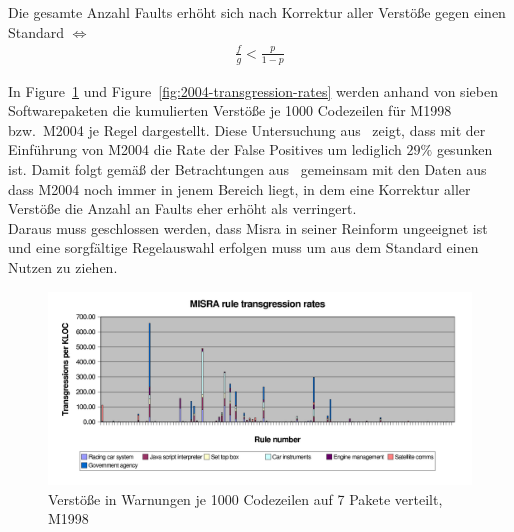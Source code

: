 \documentclass[a4paper,UKenglish,cleveref, autoref]{templates/lipics-v2019}
\begin{document}
    \begin{theorem}
        Die gesamte Anzahl Faults erhöht sich nach Korrektur aller Verstöße gegen einen Standard $\iff$
        \begin{gather*}
            \frac{f}{g} < \frac{p}{1-p}
        \end{gather*}
    \end{theorem}


    In Figure~\ref{fig:1998-transgression-rates} und Figure~\ref{fig:2004-transgression-rates} werden anhand von sieben
    Softwarepaketen die kumulierten Verstöße je 1000 Codezeilen für M1998 bzw.\ M2004 je Regel dargestellt.
    Diese Untersuchung aus~\cite{hatton2007language} zeigt, dass mit der Einführung von M2004 die Rate der False Positives
    um lediglich $29\%$ gesunken ist.
    Damit folgt gemäß der Betrachtungen aus~\cite{hatton2007language} gemeinsam mit den Daten aus~\cite{transgression-data}
    dass M2004 noch immer in jenem Bereich liegt, in dem eine Korrektur aller Verstöße die Anzahl an Faults
    eher erhöht als verringert.\\
    Daraus muss geschlossen werden, dass Misra in seiner Reinform ungeeignet ist und eine sorgfältige Regelauswahl erfolgen
    muss um aus dem Standard einen Nutzen zu ziehen.

    \begin{figure}[H]
        \centering
        \captionsetup{justification=centering,margin=2cm}
        \includegraphics[width=\textwidth]{graphics/1998-transgression-rates.png}
        \caption{Verstöße in Warnungen je 1000 Codezeilen auf 7 Pakete verteilt, M1998\cite{hatton2007language}}
        \label{fig:1998-transgression-rates}
    \end{figure}
\end{document}
